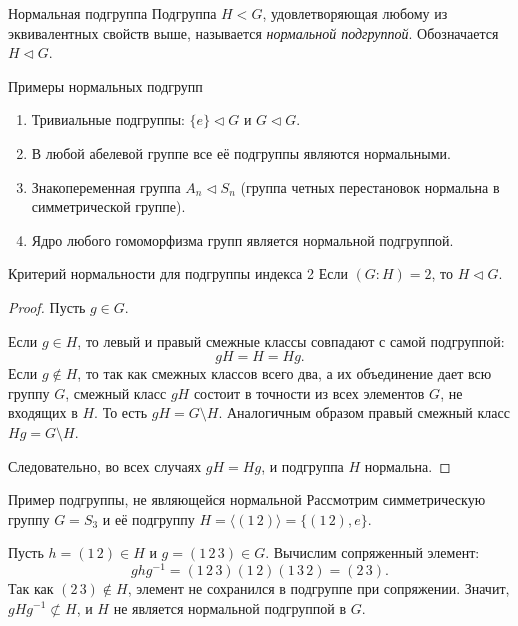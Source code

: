 \begin{Definition}{Нормальная подгруппа}{}
	Подгруппа $H < G$, удовлетворяющая любому из эквивалентных свойств выше, называется \emph{нормальной подгруппой}. Обозначается $H \triangleleft G$.
\end{Definition}

\begin{Example}{Примеры нормальных подгрупп}{}
	\begin{enumerate}
		\item Тривиальные подгруппы: $\{e\} \triangleleft G$ и $G \triangleleft G$.
		\item В любой абелевой группе все её подгруппы являются нормальными.
		\item Знакопеременная группа $A_n \triangleleft S_n$ (группа четных перестановок нормальна в симметрической группе).
		\item Ядро любого гомоморфизма групп является нормальной подгруппой.
	\end{enumerate}
\end{Example}

\begin{Lemma}{Критерий нормальности для подгруппы индекса 2}{}
	Если $(G:H) = 2$, то $H \triangleleft G$.
\end{Lemma}

\begin{proof}
	Пусть $g \in G$.
	
	Если $g \in H$, то левый и правый смежные классы совпадают с самой подгруппой:
	\[
	gH = H = Hg.
	\]
	Если $g \notin H$, то так как смежных классов всего два, а их объединение дает всю группу $G$, смежный класс $gH$ состоит в точности из всех элементов $G$, не входящих в $H$. То есть $gH = G \setminus H$. Аналогичным образом правый смежный класс $Hg = G \setminus H$.
	
	Следовательно, во всех случаях $gH = Hg$, и подгруппа $H$ нормальна.
\end{proof}

\begin{Example}{Пример подгруппы, не являющейся нормальной}{}
	Рассмотрим симметрическую группу $G = S_3$ и её подгруппу $H = \langle(1\,2)\rangle = \{(1\,2), e\}$.
	
	Пусть $h = (1\,2) \in H$ и $g = (1\,2\,3) \in G$. Вычислим сопряженный элемент:
	\[
	ghg^{-1} = (1\,2\,3)(1\,2)(1\,3\,2) = (2\,3).
	\]
	Так как $(2\,3) \notin H$, элемент не сохранился в подгруппе при сопряжении. Значит, $gHg^{-1} \not\subset H$, и $H$ не является нормальной подгруппой в $G$.
\end{Example}